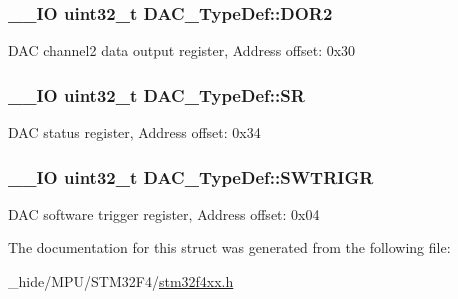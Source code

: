 \subsubsection[{D\+O\+R2}]{\setlength{\rightskip}{0pt plus 5cm}\+\_\+\+\_\+\+I\+O uint32\+\_\+t D\+A\+C\+\_\+\+Type\+Def\+::\+D\+O\+R2}\label{struct_d_a_c___type_def_a1bde8391647d6422b39ab5ba4f13848b}
D\+A\+C channel2 data output register, Address offset\+: 0x30 \hypertarget{struct_d_a_c___type_def_a1d3fd83d6ed8b2d90b471db4509b0e70}{}
\subsubsection[{S\+R}]{\setlength{\rightskip}{0pt plus 5cm}\+\_\+\+\_\+\+I\+O uint32\+\_\+t D\+A\+C\+\_\+\+Type\+Def\+::\+S\+R}\label{struct_d_a_c___type_def_a1d3fd83d6ed8b2d90b471db4509b0e70}
D\+A\+C status register, Address offset\+: 0x34 \hypertarget{struct_d_a_c___type_def_a4ccb66068a1ebee1179574dda20206b6}{}
\subsubsection[{S\+W\+T\+R\+I\+G\+R}]{\setlength{\rightskip}{0pt plus 5cm}\+\_\+\+\_\+\+I\+O uint32\+\_\+t D\+A\+C\+\_\+\+Type\+Def\+::\+S\+W\+T\+R\+I\+G\+R}\label{struct_d_a_c___type_def_a4ccb66068a1ebee1179574dda20206b6}
D\+A\+C software trigger register, Address offset\+: 0x04 

The documentation for this struct was generated from the following file\+:\begin{DoxyCompactItemize}
\item 
\+\_\+hide/\+M\+P\+U/\+S\+T\+M32\+F4/\hyperlink{stm32f4xx_8h}{stm32f4xx.\+h}\end{DoxyCompactItemize}
